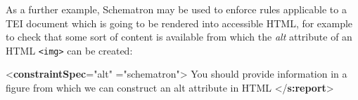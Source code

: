 As a further example, Schematron may be used to enforce rules applicable to a TEI document which is going to be rendered into accessible HTML, for example to check that some sort of content is available from which the {\itshape alt} attribute of an HTML \texttt{<img>} can be created: \par\bgroup{}\exampleFont \begin{shaded}\noindent\mbox{}{<\textbf{constraintSpec}\hspace*{1em}{ident}="{alt}"\mbox{}\newline 
\hspace*{1em}{scheme}="{schematron}">}\mbox{}\newline 
{}\mbox{}\newline 
\hspace*{1em}\mbox{}\newline 
\hspace*{1em}\mbox{}\newline 
\hspace*{1em}\hspace*{1em}\mbox{}\newline 
\hspace*{1em}\hspace*{1em}\hspace*{1em} You should provide information in a figure from\mbox{}\newline 
\hspace*{1em}\hspace*{1em}\hspace*{1em}\hspace*{1em}\hspace*{1em}\hspace*{1em}\hspace*{1em}\hspace*{1em} which we can construct an alt attribute in HTML {</\textbf{s:report}>}\mbox{}\newline 

\end{shaded}
